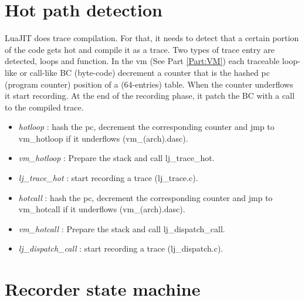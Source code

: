 

\section{Hot path detection}
\label{Sec:hot-path}
LuaJIT does trace compilation. For that, it needs to detect that a certain
portion of the code gets hot and compile it as a trace. Two types of trace entry
are detected, loops and function. In the vm (See Part \ref{Part:VM}) each
traceable loop-like or call-like BC (byte-code) decrement a counter that is the
hashed pc (program counter) position of a (64-entries) table. When the counter underflows it start recording. At the end of the recording phase, it patch the
BC with a call to the compiled trace.


\begin{itemize}
	\item \emph{hotloop} : hash the pc, decrement the corresponding counter and
jmp to vm\_hotloop if it underflows (vm\_(arch).dasc).
	\item \emph{vm\_hotloop} : Prepare the stack and call lj\_trace\_hot.
	\item \emph{lj\_trace\_hot} : start recording a trace (lj\_trace.c).
\end{itemize}


\begin{itemize}
	\item \emph{hotcall} : hash the pc, decrement the corresponding counter and
jmp to vm\_hotcall if it underflows (vm\_(arch).dasc).
	\item \emph{vm\_hotcall} : Prepare the stack and call lj\_dispatch\_call.
	\item \emph{lj\_dispatch\_call} : start recording a trace (lj\_dispatch.c).
\end{itemize}


\section{Recorder state machine}
\label{Sec:recorder-state-machine}

